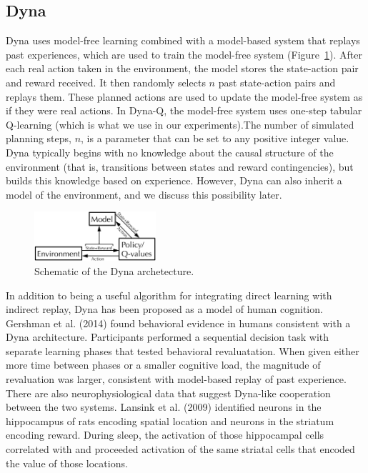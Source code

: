 \documentclass[letterpaper]{article}
\begin{document}
\subsection{Dyna}

Dyna uses model-free learning combined with a model-based system that replays past experiences, which are used to train the model-free system (Figure~\ref{fig:dyna_schematic}). After each real action taken in the environment, the model stores the state-action pair and reward received. It then randomly selects $n$ past state-action pairs and replays them. These planned actions are used to update the model-free system as if they were real actions. In Dyna-Q, the model-free system uses one-step tabular Q-learning (which is what we use in our experiments).The number of simulated planning steps, $n$, is a parameter that can be set to any positive integer value. Dyna typically begins with no knowledge about the causal structure of the environment (that is, transitions between states and reward contingencies), but builds this knowledge based on experience. However, Dyna can also inherit a model of the environment, and we discuss this possibility later.

\begin{figure}[ht]
\centering
\includegraphics[width=0.4\textwidth]{dyna_schematic}
\caption{Schematic of the Dyna archetecture.}
\label{fig:dyna_schematic}
\end{figure}

In addition to being a useful algorithm for integrating direct learning with indirect replay, Dyna has been proposed as a model of human cognition. Gershman et al. (2014) found behavioral evidence in humans consistent with a Dyna architecture. Participants performed a sequential decision task with separate learning phases that tested behavioral revaluatation. When given either more time between phases or a smaller cognitive load, the magnitude of revaluation was larger, consistent with model-based replay of past experience. There are also neurophysiological data that suggest Dyna-like cooperation between the two systems. Lansink et al. (2009) identified neurons in the hippocampus of rats encoding spatial location and neurons in the striatum encoding reward. During sleep, the activation of those hippocampal cells correlated with and proceeded activation of the same striatal cells that encoded the value of those locations.
\end{document}
